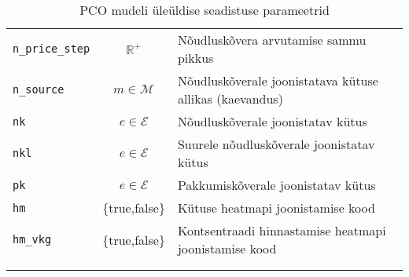 \begin{landscape}
\begin{longtable}{l c l}
\texttt{n\_price\_step}&$\mathbb{R}^+$  & Nõudluskõvera arvutamise sammu pikkus \\
\texttt{n\_source} &  $m \in \mathcal{M}$  & Nõudluskõverale joonistatava kütuse allikas (kaevandus)\\
\texttt{nk}        &  $e \in \mathcal{E}$  & Nõudluskõverale joonistatav kütus \\
\texttt{nkl}       &  $e \in \mathcal{E}$  & Suurele nõudluskõverale joonistatav kütus \\
\texttt{pk}        &  $e \in \mathcal{E}$  & Pakkumiskõverale joonistatav kütus \\
\texttt{hm}        &  \{true,false\}& Kütuse heatmapi joonistamise kood \\
\texttt{hm\_vkg}   &  \{true,false\}& Kontsentraadi hinnastamise heatmapi joonistamise kood \\   
\\  
\caption{PCO mudeli üleüldise seadistuse parameetrid}
\label{tab:conf_gen}
\end{longtable}



\end{landscape}
